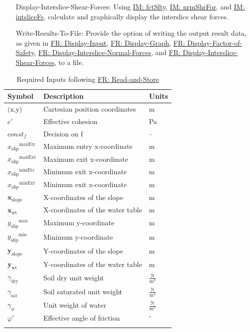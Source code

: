 \documentclass[12pt]{article}
\begin{document}
\begin{itemize}
\item[Display-Interslice-Shear-Forces:\phantomsection\label{displayShear}]Using \hyperref[IM:fctSfty]{IM: fctSfty}, \hyperref[IM:nrmShrFor]{IM: nrmShrFor}, and \hyperref[IM:intsliceFs]{IM: intsliceFs}, calculate and graphically display the interslice shear forces.
\item[Write-Results-To-File:\phantomsection\label{writeToFile}]Provide the option of writing the output result data, as given in \hyperref[displayInput]{FR: Display-Input}, \hyperref[displayGraph]{FR: Display-Graph}, \hyperref[displayFS]{FR: Display-Factor-of-Safety}, \hyperref[displayNormal]{FR: Display-Interslice-Normal-Forces}, and \hyperref[displayShear]{FR: Display-Interslice-Shear-Forces}, to a file.
\end{itemize}
\begin{longtable}{l l l}
\toprule
\textbf{Symbol} & \textbf{Description} & \textbf{Units}
\\
\midrule
\endhead
$\text{(x,y)}$ & Cartesian position coordinates & m
\\
$c'$ & Effective cohesion & Pa
\\
$const_f$ & Decision on f & --
\\
${{x_{\text{slip}}}^{\text{maxEtr}}}$ & Maximum entry x-coordinate & m
\\
${{x_{\text{slip}}}^{\text{maxExt}}}$ & Maximum exit x-coordinate & m
\\
${{x_{\text{slip}}}^{\text{minEtr}}}$ & Minimum exit x-coordinate & m
\\
${{x_{\text{slip}}}^{\text{minExt}}}$ & Minimum exit x-coordinate & m
\\
${\mathbf{x}_{\text{slope}}}$ & X-coordinates of the slope & m
\\
${\mathbf{x}_{\text{wt}}}$ & X-coordinates of the water table & m
\\
${{y_{\text{slip}}}^{\text{max}}}$ & Maximum y-coordinate & m
\\
${{y_{\text{slip}}}^{\text{min}}}$ & Minimum y-coordinate & m
\\
${\mathbf{y}_{\text{slope}}}$ & Y-coordinates of the slope & m
\\
${\mathbf{y}_{\text{wt}}}$ & Y-coordinates of the water table & m
\\
${γ_{\text{dry}}}$ & Soil dry unit weight & $\frac{\text{N}}{\text{m}^{3}}$
\\
${γ_{\text{sat}}}$ & Soil saturated unit weight & $\frac{\text{N}}{\text{m}^{3}}$
\\
${γ_{w}}$ & Unit weight of water & $\frac{\text{N}}{\text{m}^{3}}$
\\
$φ'$ & Effective angle of friction & ${}^{\circ}$
\\
\bottomrule
\caption{Required Inputs following \hyperref[readAndStore]{FR: Read-and-Store}}
\label{Table:ReqInputs}
\end{longtable}
\end{document}
